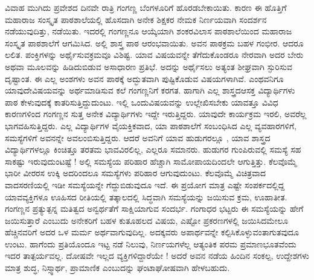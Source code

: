 {ವಿವಾಹ ಮುಗಿದು ಪ್ರವೇಶದ  ದಿನವೇ  ರಾತ್ರಿ ಗಂಗಣ್ಣ ಬೆಂಗಳೂರಿಗೆ ಹೊರಡಬೇಕಾಯಿತು. ಕಾರಣ ಈ ಹೊತ್ತಿಗೆ ಮಹಾರಾಜ ಸಂಸ್ಕೃತ ಪಾಠಶಾಲೆಯಲ್ಲಿ ಹೊಸದಾಗಿ ಅನೇಕ ಶಿಕ್ಷಕರ ನೇಮಕ ನಿರ್ಣಯವಾಗಿ ಸಂದರ್ಶನ ನಡೆಯುವುದಿತ್ತು, ನಡೆಯಿತು.  ಇದರಲ್ಲಿ ಗಂಗಣ್ಣನೂ ಆಯ್ಕೆಯಾಗಿ ಶಂಕರವಿಲಾಸ ಪಾಠಶಾಲೆಯಿಂದ ಮಹಾರಾಜ ಸಂಸ್ಕೃತ ಪಾಠಶಾಲೆಗೆ ಆಗಮಿಸಿದ. ಅಲ್ಲಿ ಶಾಸ್ತ್ರ ಪಾಠ ಆರಂಭವಾಯಿತು. ಅವನ ಪಾಠಕ್ರಮ ಬಹಳ ಗಂಭೀರ. ಆದರೂ ಲಲಿತ. ಪಂಕ್ತಿಗಳನ್ನು ಅರ್ಥೈಸುವ\break ಕ್ರಮವೂ ವಿಶಿಷ್ಟ. ಯಾವ ವಿಷಯವನ್ನೇ ತೆಗೆದುಕೊಂಡರೂ ನೇರವಾಗಿ ಅದರ ಬೇರು ಅಥವಾ ಮೂಲವನ್ನು ಹಿಡಿದುಬಿಡುವ ಅಸಾಧಾರಣ ಪ್ರತಿಭೆ. ಅದನ್ನು ಅರ್ಥೈಸಲು ಅತ್ಯಂತ ಶೀಘ್ರವಾಗಿ ಸ್ಫುರಿಸುವ ದೃಷ್ಟಾಂತ. ಈ ಎಲ್ಲ ಅಂಶಗಳು ಅವನ ಪಾಠಕ್ಕೆ ಅದ್ಭುತವಾಗಿ ಪುಷ್ಟಿಕೊಡುವ ವಿಷಯಗಳಾಗಿವೆ. ಎಂಥವನಿಗೂ ಯಾವುದೇ\break ವಿಷಯವನ್ನು ಅರ್ಥಮಾಡಿಸುವ ಕಲೆ ಗಂಗಣ್ಣನಿಗೆ ಕರಗತ. ಹಾಗಾಗಿ ಎಲ್ಲ ಶಾಸ್ತ್ರದ\break ಆಸಕ್ತ ವಿದ್ಯಾರ್ಥಿಗಳು ಪಾಠ ಕೇಳುವುದಕ್ಕೆ ಕಾತರಿಸುತ್ತಿದ್ದುದುಂಟು. ಇಲ್ಲಿ ಒಂದು\break ವಿಷಯವನ್ನು ಉಲ್ಲೇಖಿಸಬೇಕು \enginline{-} ಯಾವತ್ತೂ ವಿವಿಧ  ಕಾರಣಗಳಿಂದ ಗಂಗಣ್ಣನ ಸುತ್ತ ಅನೇಕ ವಿದ್ಯಾರ್ಥಿಗಳು ಇದ್ದೇ ಇರುತ್ತಿದ್ದರು. ಯಾವುದೇ ಕಾರ್ಯಕ್ರಮ ಇರಲಿ, ಅವರೆಲ್ಲ ಭಾಗವಹಿಸುತ್ತಿದ್ದರು.  ಎಲ್ಲ ವಿದ್ಯಾರ್ಥಿಗಳ ವೈಯಕ್ತಿಕವಾದ, ಯಾ  ಪಾಠಶಾಲೆಗೆ ಸಂಬಂಧಿಸಿದ ಎಲ್ಲ ವ್ಯವಹಾರಗಳಿಗೆ, ಸಮಸ್ಯೆಗಳಿಗೆ ಅವನನ್ನೇ ಅವಲಂಬಿಸುತ್ತಿದ್ದರು. ಆದರೆ ಅವನಿಗೆ ಯಾವ ಹುಡುಗರಲ್ಲೂ , ಯಾವ ಶಾಸ್ತ್ರದ \hbox{ವಿದ್ಯಾರ್ಥಿಗಳಲ್ಲೂ} ಕಿಂಚಿತ್ತೂ ತರತಮ ಭಾವ\-ವಿರಲಿಲ್ಲ, ಎಲ್ಲರೂ ಸಮಾನರು. \hbox{ಹುಡುಗರ} ಗುಂಪಿರುವಲ್ಲಿ ಸಮಸ್ಯೆ ಸಹ ಸಾಕಷ್ಟು ಇರುವುದುಂಟಷ್ಟೆ ! ಅಲ್ಲಿ  ಸಮಸ್ಯೆಯ ಪರಿಹಾರ ಹೆಚ್ಚಾಗಿ ಸಾಮೋಪಾಯ\-ದಿಂದಲೇ ಆಗುತ್ತಿತ್ತು. ಕೆಲವೊಮ್ಮೆ ಭಾರೀ ವೀರರಸ ಉಕ್ಕಿ ಅದರಿಂದಲೂ ಸಮಸ್ಯೆಗಳು ಪರಿಹಾರ ಆಗುವುದುಂಟು.  ಕೆಲವೊಮ್ಮೆ ವಿಚಿತ್ರವಾದ ವಾದಸರಣಿಯಲ್ಲಿ  ಇಡೀ ಸಮಸ್ಯೆಯನ್ನೇ ಗೆದ್ದುಬಿಡುವುದೂ ಇದೆ.  ಈ ಪ್ರಯೋಗ ಮಾತ್ರ ಎಷ್ಟೇ ಸಂಪರ್ಕದಲ್ಲಿದ್ದ ಯಾವ\break ವ್ಯಕ್ತಿಗಳೂ ಊಹಿಸದ ರೀತಿಯಲ್ಲಿ ತತ್ಕಾಲದಲ್ಲಿ ಸಿದ್ಧವಾಗಿ ಸಮಸ್ಯೆಯನ್ನು ಜಯಿಸುವ ಕ್ರಮ, ಊಹಾತೀತ. ಗಂಗಣ್ಣನ ಪ್ರತ್ಯುತ್ಪನ್ನ ಮತಿತ್ವದ ಅನ್ವರ್ಥತೆಗೆ ಸಾಕ್ಷಿಯಾಗುವ ಸಂದರ್ಭ.   ಗಂಗಾಧರ ಭಟ್ಟರು ಈ ಸಮಸ್ಯೆಯನ್ನು ಹೇಗೆ ಜಯಿಸುತ್ತಾರೆ ಎಂಬುದು ಅನೇಕರಿಗೆ ಬಹಳ ಕುತೂಹಲದ ವಿಷಯ, ಎಷ್ಟೋ ಪ್ರಕರಣಗಳಲ್ಲಿ ಜಯಿಸಿದ\break ಮೇಲೂ ಹೆಚ್ಚಿನವರಿಗೆ ಅದರ ಒಳ ಮರ್ಮ ಅರ್ಥವಾಗುವುದಿಲ್ಲ. ಅದಕ್ಕವರು ಅಪಾರ್ಥ\-ವನ್ನೇ ಕಲ್ಪಿಸಿಕೊಳ್ಳುವಂತಾಗುತವುದೂ ಉಂಟು. ಹಾಗೆಂದು ಪ್ರತಿಯೊಂದೂ ಇಟ್ಟ ನಡೆ ನಿಲುವು, ನಿರ್ಣಯಗಳೆಲ್ಲ  ಆತ್ಯಂತಿಕ  ಪರಮ ಪ್ರಮಾಣಭೂತವೆಂದು ಇದರ ತಾತ್ಪರ್ಯವಲ್ಲ. ದೋಷವೇ ಇಲ್ಲದ ವ್ಯಕ್ತಿಗಳಿದ್ದಾರೆಯೇ ! ಅದರೆ ಅವನ ನಡೆಯ ಹಿಂದಿನ ಸಂಕಲ್ಪ, ಉದ್ದೇಶಗಳು ಮಾತ್ರ  ಶುದ್ಧ, ನಿಸ್ಸ್ವಾರ್ಥ,  ಪ್ರಾಮಾಣಿಕ ಎಂಬುದನ್ನು ಘಂಟಾಘೋಷವಾಗಿ ಹೇಳಬಹುದು. 

}
